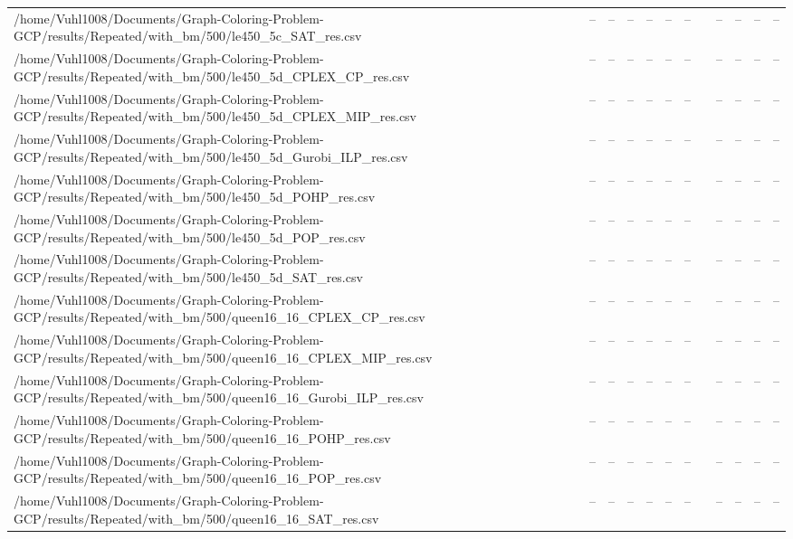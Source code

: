 \begin{table}[htbp]
\begin{tabular}{llllllllllll}
/home/Vuhl1008/Documents/Graph-Coloring-Problem-GCP/results/Repeated/with\_bm/500/le450\_5c\_SAT\_res.csv & -- & -- & -- & -- & -- & -- & {} & -- & -- & -- & -- \\
/home/Vuhl1008/Documents/Graph-Coloring-Problem-GCP/results/Repeated/with\_bm/500/le450\_5d\_CPLEX\_CP\_res.csv & -- & -- & -- & -- & -- & -- & {} & -- & -- & -- & -- \\
/home/Vuhl1008/Documents/Graph-Coloring-Problem-GCP/results/Repeated/with\_bm/500/le450\_5d\_CPLEX\_MIP\_res.csv & -- & -- & -- & -- & -- & -- & {} & -- & -- & -- & -- \\
/home/Vuhl1008/Documents/Graph-Coloring-Problem-GCP/results/Repeated/with\_bm/500/le450\_5d\_Gurobi\_ILP\_res.csv & -- & -- & -- & -- & -- & -- & {} & -- & -- & -- & -- \\
/home/Vuhl1008/Documents/Graph-Coloring-Problem-GCP/results/Repeated/with\_bm/500/le450\_5d\_POHP\_res.csv & -- & -- & -- & -- & -- & -- & {} & -- & -- & -- & -- \\
/home/Vuhl1008/Documents/Graph-Coloring-Problem-GCP/results/Repeated/with\_bm/500/le450\_5d\_POP\_res.csv & -- & -- & -- & -- & -- & -- & {} & -- & -- & -- & -- \\
/home/Vuhl1008/Documents/Graph-Coloring-Problem-GCP/results/Repeated/with\_bm/500/le450\_5d\_SAT\_res.csv & -- & -- & -- & -- & -- & -- & {} & -- & -- & -- & -- \\
/home/Vuhl1008/Documents/Graph-Coloring-Problem-GCP/results/Repeated/with\_bm/500/queen16\_16\_CPLEX\_CP\_res.csv & -- & -- & -- & -- & -- & -- & {} & -- & -- & -- & -- \\
/home/Vuhl1008/Documents/Graph-Coloring-Problem-GCP/results/Repeated/with\_bm/500/queen16\_16\_CPLEX\_MIP\_res.csv & -- & -- & -- & -- & -- & -- & {} & -- & -- & -- & -- \\
/home/Vuhl1008/Documents/Graph-Coloring-Problem-GCP/results/Repeated/with\_bm/500/queen16\_16\_Gurobi\_ILP\_res.csv & -- & -- & -- & -- & -- & -- & {} & -- & -- & -- & -- \\
/home/Vuhl1008/Documents/Graph-Coloring-Problem-GCP/results/Repeated/with\_bm/500/queen16\_16\_POHP\_res.csv & -- & -- & -- & -- & -- & -- & {} & -- & -- & -- & -- \\
/home/Vuhl1008/Documents/Graph-Coloring-Problem-GCP/results/Repeated/with\_bm/500/queen16\_16\_POP\_res.csv & -- & -- & -- & -- & -- & -- & {} & -- & -- & -- & -- \\
/home/Vuhl1008/Documents/Graph-Coloring-Problem-GCP/results/Repeated/with\_bm/500/queen16\_16\_SAT\_res.csv & -- & -- & -- & -- & -- & -- & {} & -- & -- & -- & -- \\

\end{tabular}
\end{table}
